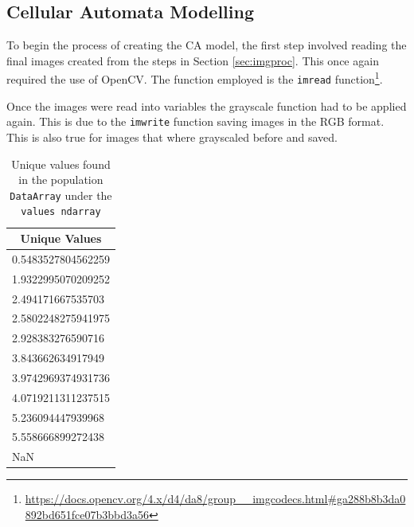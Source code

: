 \subsection{Cellular Automata Modelling}
To begin the process of creating the CA model, the first step involved reading the final images created from the steps in Section \ref{sec:imgproc}. This once again required the use of OpenCV. The function employed is the \texttt{imread} function\footnote{\url{https://docs.opencv.org/4.x/d4/da8/group__imgcodecs.html\#ga288b8b3da0892bd651fce07b3bbd3a56}}.

Once the images were read into variables the grayscale function had to be applied again. This is due to the \texttt{imwrite} function saving images in the RGB format. This is also true for images that where grayscaled before and saved.

\begin{table}[H]
\caption{Unique values found in the population \texttt{DataArray} under the \texttt{values ndarray}}
\centering
\begin{tabular}{@{}l@{}}
\toprule
\multicolumn{1}{c}{Unique Values} \\ \midrule
0.5483527804562259                \\
1.9322995070209252                \\
2.494171667535703                 \\
2.5802248275941975                \\
2.928383276590716                 \\
3.843662634917949                 \\
3.9742969374931736                \\
4.0719211311237515                \\
5.236094447939968                 \\
5.558666899272438                 \\
NaN                               \\ \bottomrule
\end{tabular}
\end{table}

